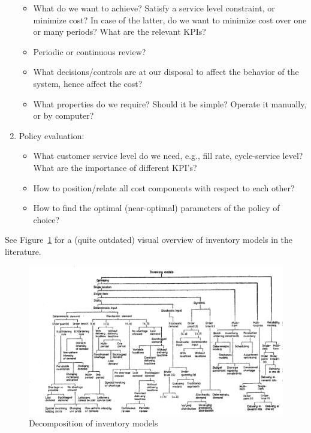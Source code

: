 \begin{solution}
\begin{enumerate}
      \begin{itemize}
      \item What do we want to achieve? Satisfy a service level
        constraint, or minimize cost? In case of the latter, do we
        want to minimize cost over one or many periods? What are the relevant KPIs? 
      \item Periodic or continuous review?
      \item What decisions/controls are at our disposal to affect the
        behavior of the system, hence affect the cost?
      \item What properties do we require? Should it be simple?
        Operate it manually, or by computer? 
      \end{itemize}
    \item Policy evaluation:
      \begin{itemize}
      \item What customer service level do we
        need, e.g., fill rate, cycle-service level? What are the importance of different KPI's?
      \item How to position/relate all cost components with respect to
        each other?
      \item How to find the optimal (near-optimal) parameters of the policy of choice?
      \end{itemize}
    \end{enumerate}

See Figure~\ref{fig:costs} for a (quite outdated) visual overview of inventory models in the literature.

\begin{figure}[h]
\centering
\includegraphics[width=\textwidth]{figures/chikan.png}
\caption{Decomposition of inventory models}
\label{fig:costs}
\end{figure}
  \end{solution}

